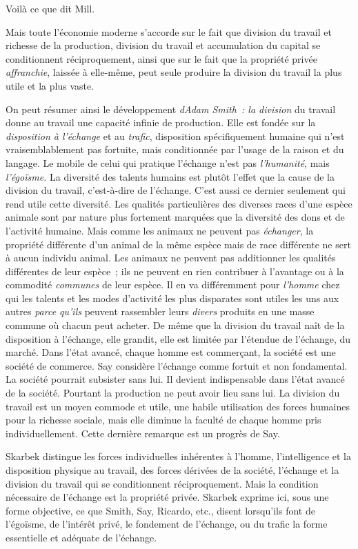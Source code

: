 \documentclass[french,twoside]{book} %
\begin{document}
\noindent Voilà ce que dit Mill.\par
\bigbreak
\noindent Mais toute l’économie moderne s’accorde sur le fait que division du travail et richesse de la production, division du travail et accumulation du capital se conditionnent réciproquement, ainsi que sur le fait que la propriété privée \emph{affranchie}, laissée à elle-même, peut seule produire la division du travail la plus utile et la plus vaste.\par
On peut résumer ainsi le développement \emph{dAdam Smith : la division} du travail donne au travail une capacité infinie de production. Elle est fondée sur la \emph{disposition à l’échange} et au \emph{trafic}, disposition spécifiquement humaine qui n’est vraisemblablement pas fortuite, mais conditionnée par l’usage de la raison et du langage. Le mobile de celui qui pratique l’échange n’est pas \emph{l’humanité}, mais \emph{l’égoïsme.} La diversité des talents humains est plutôt l’effet que la cause de la division du travail, c’est-à-dire de l’échange. C’est aussi ce dernier seulement qui rend utile cette diversité. Les qualités particulières des diverses races d’une espèce animale sont par nature plus fortement marquées que la diversité des dons et de l’activité humaine. Mais comme les animaux ne peuvent pas \emph{échanger}, la propriété différente d’un animal de la même espèce mais de race différente ne sert à aucun individu animal. Les animaux ne peuvent pas additionner les qualités différentes de leur espèce ; ils ne peuvent en rien contribuer à l’avantage ou à la commodité \emph{communes} de leur espèce. Il en va différemment pour \emph{l’homme} chez qui les talents et les modes d’activité les plus disparates sont utiles les uns aux autres \emph{parce qu’ils} peuvent rassembler leurs \emph{divers} produits en une masse commune où chacun peut acheter. De même que la division du travail naît de la disposition à l’échange, elle grandit, elle est limitée par l’étendue de l’échange, du marché. Dans l’état avancé, chaque homme est commerçant, la société est une société de commerce. Say considère l’échange comme fortuit et non fondamental. La société pourrait subsister sans lui. Il devient indispensable dans l’état avancé de la société. Pourtant la production ne peut avoir lieu sans lui. La division du travail est un moyen commode et utile, une habile utilisation des forces humaines pour la richesse sociale, mais elle diminue la faculté de chaque homme pris individuellement. Cette dernière remarque est un progrès de Say.\par
Skarbek distingue les forces individuelles inhérentes à l’homme, l’intelligence et la disposition physique au travail, des forces dérivées de la société, l’échange et la division du travail qui se conditionnent réciproquement. Mais la condition nécessaire de l’échange est la propriété privée. Skarbek exprime ici, sous une forme objective, ce que Smith, Say, Ricardo, etc., disent lorsqu’ils font de l’égoïsme, de l’intérêt privé, le fondement de l’échange, ou du trafic la forme essentielle et adéquate de l’échange.\par
\end{document}
